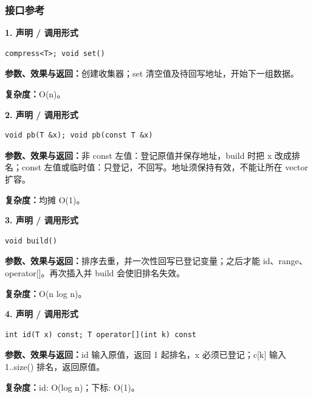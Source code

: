 \documentclass[UTF8,a4paper,10pt]{ctexart}
\begin{document}
\subsubsection*{接口参考}
\noindent\begin{minipage}{\textwidth}
\textbf{1. 声明 / 调用形式}
\begin{lstlisting}
compress<T>; void set()
\end{lstlisting}
\textbf{参数、效果与返回：}创建收集器；set 清空值及待回写地址，开始下一组数据。

\textbf{复杂度：}O(n)。

\end{minipage}\par\vspace{0.4em}
\noindent\begin{minipage}{\textwidth}
\textbf{2. 声明 / 调用形式}
\begin{lstlisting}
void pb(T &x); void pb(const T &x)
\end{lstlisting}
\textbf{参数、效果与返回：}非 const 左值：登记原值并保存地址，build 时把 x 改成排名；const 左值或临时值：只登记，不回写。地址须保持有效，不能让所在 vector 扩容。

\textbf{复杂度：}均摊 O(1)。

\end{minipage}\par\vspace{0.4em}
\noindent\begin{minipage}{\textwidth}
\textbf{3. 声明 / 调用形式}
\begin{lstlisting}
void build()
\end{lstlisting}
\textbf{参数、效果与返回：}排序去重，并一次性回写已登记变量；之后才能 id、range、operator[]。再次插入并 build 会使旧排名失效。

\textbf{复杂度：}O(n log n)。

\end{minipage}\par\vspace{0.4em}
\noindent\begin{minipage}{\textwidth}
\textbf{4. 声明 / 调用形式}
\begin{lstlisting}
int id(T x) const; T operator[](int k) const
\end{lstlisting}
\textbf{参数、效果与返回：}id 输入原值，返回 1 起排名，x 必须已登记；c[k] 输入 1..size() 排名，返回原值。

\textbf{复杂度：}id: O(log n)；下标: O(1)。

\end{minipage}\par\vspace{0.4em}
\end{document}
